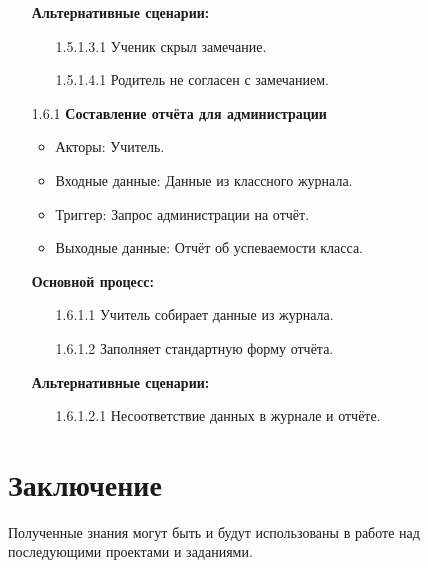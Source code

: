 \documentclass[a4paper, final]{article}
\begin{document}
\begin{enumerate}
  \textbf{Альтернативные сценарии:}
  \begin{itemize}
    \item[1.5.1.3.1] Ученик скрыл замечание.
    \item[1.5.1.4.1] Родитель не согласен с замечанием.
  \end{itemize}

  \item[1.6.1] \textbf{Составление отчёта для администрации}
  \begin{itemize}
    \item Акторы: Учитель.
    \item Входные данные: Данные из классного журнала.
    \item Триггер: Запрос администрации на отчёт.
    \item Выходные данные:  Отчёт об успеваемости класса.
  \end{itemize}

  \textbf{Основной процесс:}
  \begin{enumerate}
    \item[1.6.1.1] Учитель собирает данные из журнала.
    \item[1.6.1.2] Заполняет стандартную форму отчёта.
  \end{enumerate} 

  \textbf{Альтернативные сценарии:}
  \begin{itemize}
    \item[1.6.1.2.1] Несоответствие данных в журнале и отчёте.
  \end{itemize}
\end{enumerate}

\newpage
\section*{Заключение}
Полученные знания могут быть и будут использованы в работе над последующими проектами и заданиями.

\cleardoublepage
{}
\newpage
\begin{thebibliography}{0}
\end{thebibliography}
\end{document}
